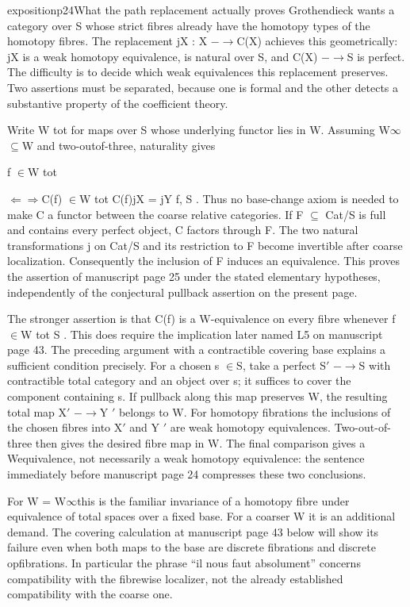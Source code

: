 \begin{dcomment}{exposition}{p24}{What the path replacement actually proves}
Grothendieck wants a category over S whose strict fibres already have the homotopy types of the homotopy fibres. The replacement jX : X \ensuremath{-}\ensuremath{\to}C(X) achieves this geometrically: jX is a weak homotopy equivalence, is natural over S, and C(X) \ensuremath{-}\ensuremath{\to}S is perfect. The difficulty is to decide which weak equivalences this replacement preserves. Two assertions must be separated, because one is formal and the other detects a substantive property of the coefficient theory.

Write W tot for maps over S whose underlying functor lies in W. Assuming W\ensuremath{\infty}\ensuremath{\subseteq}W and two-outof-three, naturality gives

f \ensuremath{\in}W tot

\ensuremath{\Leftarrow}\ensuremath{\Rightarrow}C(f) \ensuremath{\in}W tot C(f)jX = jY f, S . Thus no base-change axiom is needed to make C a functor between the coarse relative categories. If F \ensuremath{\subseteq} Cat/S is full and contains every perfect object, C factors through F. The two natural transformations j on Cat/S and its restriction to F become invertible after coarse localization. Consequently the inclusion of F induces an equivalence. This proves the assertion of manuscript page 25 under the stated elementary hypotheses, independently of the conjectural pullback assertion on the present page.

The stronger assertion is that C(f) is a W-equivalence on every fibre whenever f \ensuremath{\in}W tot S . This does require the implication later named L5 on manuscript page 43. The preceding argument with a contractible covering base explains a sufficient condition precisely. For a chosen s \ensuremath{\in}S, take a perfect S\ensuremath{\prime} \ensuremath{-}\ensuremath{\to}S with contractible total category and an object over s; it suffices to cover the component containing s. If pullback along this map preserves W, the resulting total map X\ensuremath{\prime} \ensuremath{-}\ensuremath{\to}Y \ensuremath{\prime} belongs to W. For homotopy fibrations the inclusions of the chosen fibres into X\ensuremath{\prime} and Y \ensuremath{\prime} are weak homotopy equivalences. Two-out-of-three then gives the desired fibre map in W. The final comparison gives a Wequivalence, not necessarily a weak homotopy equivalence: the sentence immediately before manuscript page 24 compresses these two conclusions.

For W = W\ensuremath{\infty}this is the familiar invariance of a homotopy fibre under equivalence of total spaces over a fixed base. For a coarser W it is an additional demand. The covering calculation at manuscript page 43 below will show its failure even when both maps to the base are discrete fibrations and discrete opfibrations. In particular the phrase “il nous faut absolument” concerns compatibility with the fibrewise localizer, not the already established compatibility with the coarse one.

\end{dcomment}

